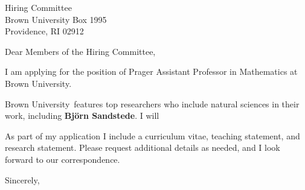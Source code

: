 \documentclass[11pt,a4paper]{letter}
\begin{document}

\def\School{Brown University}

\begin{letter}
{Hiring Committee\\
Brown University Box 1995\\
Providence, RI 02912}


\opening{Dear Members of the Hiring Committee,}

I am applying for the position of Prager Assistant Professor in Mathematics at \School. 



\School~features top researchers who include natural sciences in their work, including \textbf{Bj\"{o}rn Sandstede}. I will 



As part of my application I include a curriculum vitae, teaching statement, and research statement. Please request additional details as needed, and I look forward to our correspondence.

\closing{Sincerely,}
\end{letter}
\end{document}
